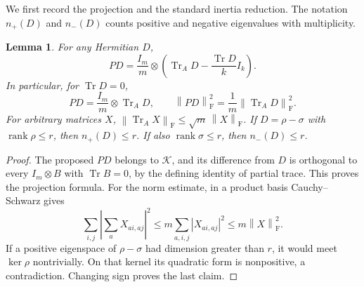 \documentclass[11pt,a4paper]{article}
\newtheorem{lemma}[theorem]{Lemma}
\newcommand{\Tr}{\operatorname{Tr}}
\newcommand{\rank}{\operatorname{rank}}
\newcommand{\F}{\mathrm F}
\newcommand{\cK}{\mathcal K}
\newcommand{\norm}[1]{\left\lVert#1\right\rVert_{\F}}
\begin{document}
We first record the projection and the standard inertia reduction.
The notation $n_+(D)$ and $n_-(D)$ counts positive and negative
eigenvalues with multiplicity.

\begin{lemma}\label{lem:projection}
For any Hermitian $D$,
\[
 PD=\frac{I_m}{m}\otimes
 \left(\Tr_A D-\frac{\Tr D}{k}I_k\right).
\]
In particular, for $\Tr D=0$,
\begin{equation}\label{eq:projection}
 PD=\frac{I_m}{m}\otimes\Tr_A D,\qquad
 \norm{PD}^2=\frac1m\norm{\Tr_A D}^2.
\end{equation}
For arbitrary matrices $X$, $\norm{\Tr_A X}\le\sqrt m\,\norm X$.
If $D=\rho-\sigma$ with $\rank\rho\le r$, then $n_+(D)\le r$.
If also $\rank\sigma\le r$, then $n_-(D)\le r$.
\end{lemma}
\begin{proof}
The proposed $PD$ belongs to $\cK$, and its difference from $D$ is
orthogonal to every $I_m\otimes B$ with $\Tr B=0$, by the defining
identity of partial trace. This proves the projection formula.
For the norm estimate, in a product basis Cauchy--Schwarz gives
\[
 \sum_{i,j}\left|\sum_a X_{ai,aj}\right|^2
 \le m\sum_{a,i,j}|X_{ai,aj}|^2\le m\norm X^2.
\]
If a positive eigenspace of $\rho-\sigma$ had dimension greater than
$r$, it would meet $\ker\rho$ nontrivially. On that kernel its quadratic
form is nonpositive, a contradiction. Changing sign proves the last
claim.
\end{proof}
\end{document}
